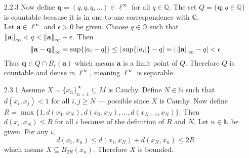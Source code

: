 \documentclass[../../Solutions.tex]{subfiles}
\begin{document}
\begin{itemize}
	\item [2.2.3] Now define $\mathbf{q} = (q,q,q,\dots) \in \ell^\infty$ for all $q \in \mathbb{Q}$.
		The set $Q = \{\mathbf{q} : q \in \mathbb{Q}\}$ is countable because it is in one-to-one correspondence with $\mathbb{Q}$. \\
		Let $\mathbf{a} \in \ell^\infty$ and $\epsilon > 0$ be given.
		Choose $q \in \mathbb{Q}$ such that $\left\lVert\mathbf{a}\right\rVert_\infty < q < \left\lVert\mathbf{a}\right\rVert_\infty + \epsilon$.
		Then
		$$ \left\lVert\mathbf{a}-\mathbf{q}\right\rVert_\infty = \sup\{|a_i-q|\} \leq |\sup\{|a_i|\}-q| = |\left\lVert\mathbf{a}\right\rVert_\infty-q| < \epsilon $$
		Thus $\mathbf{q} \in Q\cap B_\epsilon(\mathbf{a})$ which means $\mathbf{a}$ is a limit point of $Q$.
		Therefore $Q$ is countable and dense in $\ell^\infty$, meaning $\ell^\infty$ is separable.
	
	\item [2.3.1] Assume $X=\{x_n\}_{n=1}^\infty \subseteq M$ is Cauchy.
		Define $N \in \mathbb{N}$ such that $d(x_i,x_j) < 1$ for all $i,j \geq N$ --- possible since $X$ is Cauchy.
		Now define $R = \max\{ 1 , d(x_1,x_N) , d(x_2,x_N) , \dots , d(x_{N-1},x_N) \}$.
		Then $d(x_i, x_N) \leq R$ for all $i$ because of the definition of $R$ and $N$.
		Let $n \in \mathbb{N}$ be given.
		For any $i$,
		$$ d(x_i,x_n) \leq d(x_i,x_N)+d(x_N,x_n) \leq 2R $$
		which means $X \subseteq B_{2R}(x_n)$. Therefore $X$ is bounded.
	

\end{itemize}
\end{document}
